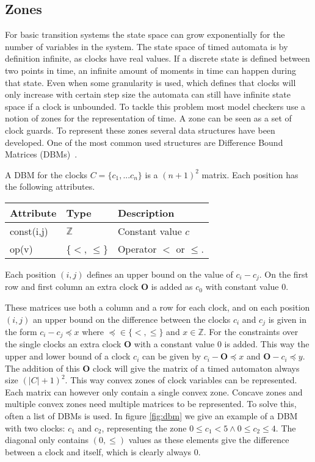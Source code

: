 \subsection{Zones}
For basic transition systems the state space can grow exponentially for the number of variables in the system. The state space of timed automata is by definition infinite, as clocks have real values. If a discrete state is defined between two points in time, an infinite amount of moments in time can happen during that state. Even when some granularity is used, which defines that clocks will only increase with certain step size the automata can still have infinite state space if a clock is unbounded. To tackle this problem most model checkers use a notion of zones for the representation of time. A zone can be seen as a set of clock guards. To represent these zones several data structures have been developed. One of the most common used structures are Difference Bound Matrices (DBMs)~\cite{dbmorig,bengtsson2002clocks}.

\begin{mydef}
A DBM for the clocks $C = \{c_1,...c_n\}$ is a $(n+1)^2$ matrix. Each position has the following attributes.

\begin{tabular}{lll}
Attribute                & Type                      & Description                                           \\\hline
const(i,j)               & $\mathbb{Z}$             & Constant value $c$ \\
op(v)                    & \{$<$, $\leq\}$     & Operator $<$ or $\leq$.                         \\
\end{tabular}

Each position $(i,j)$ defines an upper bound on the value of $c_i - c_j$. On the first row and first column an extra clock $\mathbf{O}$ is added as $c_0$ with constant value 0. 
\end{mydef}
 
These matrices use both a column and a row for each clock, and on each position $(i,j)$ an upper bound on the difference between the clocks $c_i$ and $c_j$ is given in the form $c_i - c_j \preceq x$ where $\preceq \in \{<, \leq\}$ and $x \in \mathbb{Z}$. For the constraints over the single clocks an extra clock $\mathbf{O}$ with a constant value 0 is added. This way the upper and lower bound of a clock $c_i$ can be given by $c_i - \mathbf{O} \preceq x$ and $\mathbf{O} - c_i \preceq y$. The addition of this $\mathbf{O}$ clock will give the matrix of a timed automaton always size $(|C|+1)^2$. This way convex zones of clock variables can be represented. Each matrix can however only contain a single convex zone. Concave zones and multiple convex zones need multiple matrices to be represented. To solve this, often a list of DBMs is used. In figure \ref{fig:dbm} we give an example of a DBM with two clocks: $c_1$ and $c_2$, representing the zone $0 \leq c_1 < 5 \wedge 0 \leq c_2 \leq 4$. The diagonal only contains $(0,\leq)$ values as these elements give the difference between a clock and itself, which is clearly always 0.

